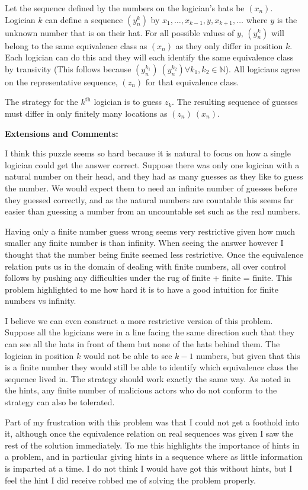 Let the sequence defined by the numbers on the logician's hats be $(x_n)$. Logician $k$ can define a sequence $(y^k_n)$ by $x_1, \dots, x_{k-1}, y, x_{k+1}, \dots$ where $y$ is the unknown number that is on their hat. For all possible values of $y$, $(y^k_n)$ will belong to the same equivalence class as $(x_n)$ as they only differ in position $k$. Each logician can do this and they will each identify the same equivalence class by transivity (This follows because $(y_n^{k_1}) ~ (y_n^{k_2}) \forall k_1, k_2 \in \mathbb{N}$). All logicians agree on the representative sequence, $(z_n)$ for that equivalence class.

The strategy for the $k^\text{th}$ logician is to guess $z_k$. The resulting sequence of guesses must differ in only finitely many locations as $(z_n) ~ (x_n)$.

\textbf{Extensions and Comments:}

I think this puzzle seems so hard because it is natural to focus on how a single logician could get the answer correct. Suppose there was only one logician with a natural number on their head, and they had as many guesses as they like to guess the number. We would expect them to need an infinite number of guesses before they guessed correctly, and as the natural numbers are countable this seems far easier than guessing a number from an uncountable set such as the real numbers.

Having only a finite number guess wrong seems very restrictive given how much smaller any finite number is than infinity. When seeing the answer however I thought that the number being finite seemed less restrictive. Once the equivalence relation puts us in the domain of dealing with finite numbers, all over control follows by pushing any difficulties under the rug of finite + finite = finite. This problem highlighted to me how hard it is to have a good intuition for finite numbers vs infinity.

I believe we can even construct a more restrictive version of this problem. Suppose all the logicians were in a line facing the same direction such that they can see all the hats in front of them but none of the hats behind them. The logician in position $k$ would not be able to see $k - 1$ numbers, but given that this is a finite number they would still be able to identify which equivalence class the sequence lived in. The strategy should work exactly the same way. As noted in the hints, any finite number of malicious actors who do not conform to the strategy can also be tolerated.

Part of my frustration with this problem was that I could not get a foothold into it, although once the equivalence relation on real sequences was given I saw the rest of the solution immediately. To me this highlights the importance of hints in a problem, and in particular giving hints in a sequence where as little information is imparted at a time. I do not think I would have got this without hints, but I feel the hint I did receive robbed me of solving the problem properly.